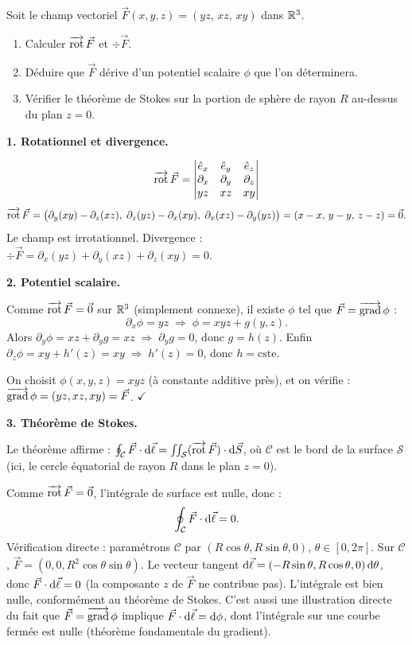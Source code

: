 \documentclass[12pt,a4paper]{article}
\begin{document}
\begin{boiteexercice}
Soit le champ vectoriel $\vec{F}(x,y,z) = (yz,\, xz,\, xy)$ dans $\mathbb{R}^3$.
\begin{enumerate}
  \item Calculer $\overrightarrow{\mathrm{rot}}\,\vec{F}$ et $\div\vec{F}$.
  \item Déduire que $\vec{F}$ dérive d'un potentiel scalaire $\phi$ que l'on déterminera.
  \item Vérifier le théorème de Stokes sur la portion de sphère de rayon $R$ au-dessus du plan $z=0$.
\end{enumerate}
\end{boiteexercice}

\begin{boitecorrige}

\textbf{1. Rotationnel et divergence.}

\[
\overrightarrow{\mathrm{rot}}\,\vec{F} = \begin{vmatrix} \hat{e}_x & \hat{e}_y & \hat{e}_z \\
\partial_x & \partial_y & \partial_z \\
yz & xz & xy \end{vmatrix}
\]
\[
\overrightarrow{\mathrm{rot}}\,\vec{F} = \bigl(\partial_y(xy) - \partial_z(xz),\;\partial_z(yz)-\partial_x(xy),\;\partial_x(xz)-\partial_y(yz)\bigr) = (x-x,\, y-y,\, z-z) = \vec{0}.
\]
Le champ est irrotationnel. Divergence : $\div\vec{F} = \partial_x(yz) + \partial_y(xz) + \partial_z(xy) = 0$.

\textbf{2. Potentiel scalaire.}

Comme $\overrightarrow{\mathrm{rot}}\,\vec{F} = \vec{0}$ sur $\mathbb{R}^3$ (simplement connexe), il existe $\phi$ tel que $\vec{F} = \overrightarrow{\mathrm{grad}}\,\phi$ :
\[
\partial_x\phi = yz \;\Rightarrow\; \phi = xyz + g(y,z).
\]
Alors $\partial_y\phi = xz + \partial_y g = xz \;\Rightarrow\; \partial_y g = 0$, donc $g = h(z)$. Enfin $\partial_z\phi = xy + h'(z) = xy \;\Rightarrow\; h'(z) = 0$, donc $h = \text{cste}$.

On choisit $\phi(x,y,z) = xyz$ (à constante additive près), et on vérifie : $\overrightarrow{\mathrm{grad}}\,\phi = (yz, xz, xy) = \vec{F}$. $\checkmark$

\textbf{3. Théorème de Stokes.}

Le théorème affirme : $\oint_\mathcal{C}\vec{F}\cdot\mathrm{d}\vec{\ell} = \iint_\mathcal{S}(\overrightarrow{\mathrm{rot}}\,\vec{F})\cdot\mathrm{d}\vec{S}$, où $\mathcal{C}$ est le bord de la surface $\mathcal{S}$ (ici, le cercle équatorial de rayon $R$ dans le plan $z=0$).

Comme $\overrightarrow{\mathrm{rot}}\,\vec{F} = \vec{0}$, l'intégrale de surface est nulle, donc :
\[
\oint_\mathcal{C} \vec{F}\cdot\mathrm{d}\vec{\ell} = 0.
\]
Vérification directe : paramétrons $\mathcal{C}$ par $(R\cos\theta, R\sin\theta, 0)$, $\theta\in[0,2\pi]$. Sur $\mathcal{C}$, $\vec{F} = (0, 0, R^2\cos\theta\sin\theta)$. Le vecteur tangent $\mathrm{d}\vec{\ell} = (-R\sin\theta, R\cos\theta, 0)\,\mathrm{d}\theta$, donc $\vec{F}\cdot\mathrm{d}\vec{\ell} = 0$ (la composante $z$ de $\vec{F}$ ne contribue pas). L'intégrale est bien nulle, conformément au théorème de Stokes. C'est aussi une illustration directe du fait que $\vec{F} = \overrightarrow{\mathrm{grad}}\,\phi$ implique $\vec{F}\cdot\mathrm{d}\vec{\ell} = \mathrm{d}\phi$, dont l'intégrale sur une courbe fermée est nulle (théorème fondamentale du gradient).


\end{boitecorrige}
\end{document}
